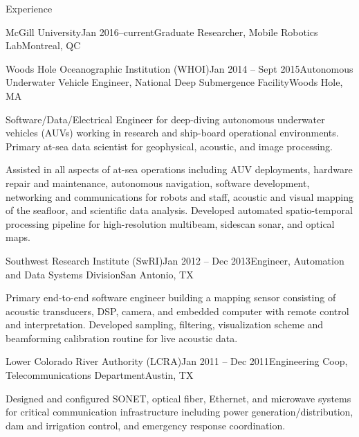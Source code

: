 \documentclass{resume} %
\begin{document}
\begin{rSection}{Experience}
\begin{rSubsection}{McGill University}{Jan 2016--current}{Graduate Researcher, Mobile Robotics Lab}{Montreal, QC}
\end{rSubsection}
	\vspace{-.2cm}
\begin{rSubsection}{Woods Hole Oceanographic Institution (WHOI)}{Jan 2014 -- Sept 2015}{Autonomous Underwater Vehicle Engineer, National Deep Submergence Facility}{Woods Hole, MA}
\item{Software/Data/Electrical Engineer for deep-diving autonomous underwater vehicles (AUVs) working in research and ship-board operational environments. Primary at-sea data scientist for geophysical, acoustic, and image processing.}
\item{Assisted in all aspects of at-sea operations including AUV deployments, hardware repair and maintenance, autonomous navigation, software development, networking and communications for robots and staff, acoustic and visual mapping of the seafloor, and scientific data analysis. Developed automated spatio-temporal processing pipeline for high-resolution multibeam, sidescan sonar, and optical maps.}
\end{rSubsection}
	\vspace{-.2cm}
\begin{rSubsection}{Southwest Research Institute (SwRI)}{Jan 2012 -- Dec 2013}{Engineer, Automation and Data Systems Division}{San Antonio, TX}{}
\item{Primary end-to-end software engineer building a mapping sensor consisting of acoustic transducers, DSP, camera, and embedded computer with remote control and interpretation. Developed sampling, filtering, visualization scheme and beamforming calibration routine for live acoustic data.}
\end{rSubsection}
\begin{rSubsection}{Lower Colorado River Authority (LCRA)}{Jan 2011 -- Dec 2011}{Engineering Coop, Telecommunications Department}{Austin, TX}
\item{Designed and configured SONET, optical fiber, Ethernet, and microwave systems for critical communication infrastructure including power generation/distribution, dam and irrigation control, and emergency response coordination. }
\end{rSubsection}
\end{rSection}
\end{document}
